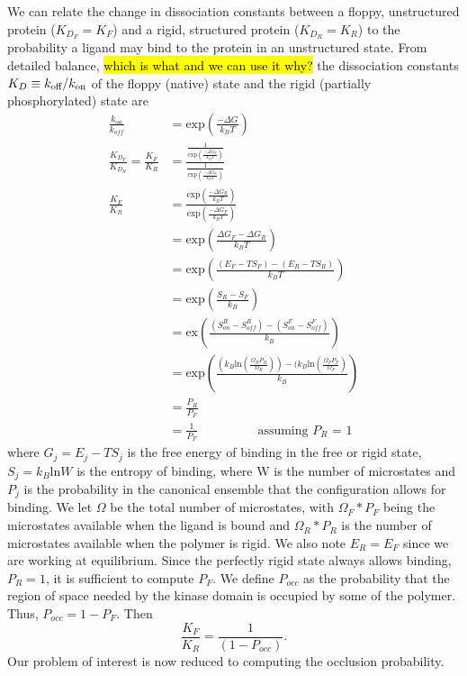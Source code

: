 \documentclass[../AdvancementSummary.tex]{subfiles}
\begin{document}
We can relate the change in dissociation constants between a floppy, unstructured protein ($K_{D_F} = K_F$) and a rigid, structured protein ($K_{D_R} = K_R$) to the probability a ligand may bind to the protein in an unstructured state. From detailed balance, \hl{which is what and we can use it why?} the dissociation constants $K_D \equiv k_{\mbox{\scriptsize off}}/k_{\mbox{\scriptsize on}}$ of the floppy (native) state and the rigid (partially phosphorylated) state are
\begin{align} 
\frac{k_{on}}{k_{off}} &= \mbox{exp} \left( \frac{-\Delta G}{k_B T}\right) \\
\frac{K_{D_F}}{K_{D_R}} = \frac{K_F}{K_R} &= \frac{\frac{1}{\mbox{exp} \left( \frac{-\Delta G_F}{k_B T}\right) }}{\frac{1}{\mbox{exp} \left( \frac{-\Delta G_R}{k_B T}\right)}} \\ 
\frac{K_F}{K_R} &= \frac{\mbox{exp} \left( \frac{-\Delta G_R}{k_B T} \right)}{\mbox{exp} \left( \frac{-\Delta G_F}{k_B T} \right)} \\
&= \mbox{exp} \left(\frac{\Delta G_F-\Delta G_R}{k_B T}\right) \\
&= \mbox{exp} \left( \frac{(E_F-T S_F)-(E_R-T S_R)}{k_B T} \right) \\
&= \mbox{exp} \left(\frac{S_R-S_F}{k_B}\right) \\
&=\mbox{ex}\left(\frac{(S^R_{on}-S^R_{off}) - (S^F_{on}-S^F_{off})}{k_B} \right) \\
&= \mbox{exp} \left( \frac{(k_B \mbox{ln} (\frac{\Omega_R P_R}{\Omega_R}))-(k_B \mbox{ln}(\frac{\Omega_F P_F}{\Omega_F})}{k_B} \right) \\
&= \frac{P_R}{P_F}\\
&=\frac{1}{P_F} \hspace{2cm} \text{assuming $P_R$ = 1}
\end{align}  
where $G_j=E_j-TS_j$ is the free energy of binding in the free or rigid state, $S_j = k_B \mbox{ln} W$ is the entropy of binding, where W is the number of microstates and $P_j$ is the probability in the canonical ensemble that the configuration allows for binding. We let $\Omega$ be the total number of microstates, with $\Omega_F * P_F$ being the microstates available when the ligand is bound and $\Omega_R*P_R$ is the number of microstates available when the polymer is rigid.  We also note $E_R = E_F$ since we are working at equilibrium. Since the perfectly rigid state always allows binding, $P_R=1$, it is sufficient to compute $P_F$. We define $P_{occ}$ as the probability that the region of space needed by the kinase domain is occupied by some of the polymer. Thus, $P_{occ}=1-P_F$. Then
\begin{equation}
\frac{K_F}{K_R} = \frac{1}{(1-P_{occ})}.
\end{equation}
Our problem of interest is now reduced to computing the occlusion probability. 
\end{document}
